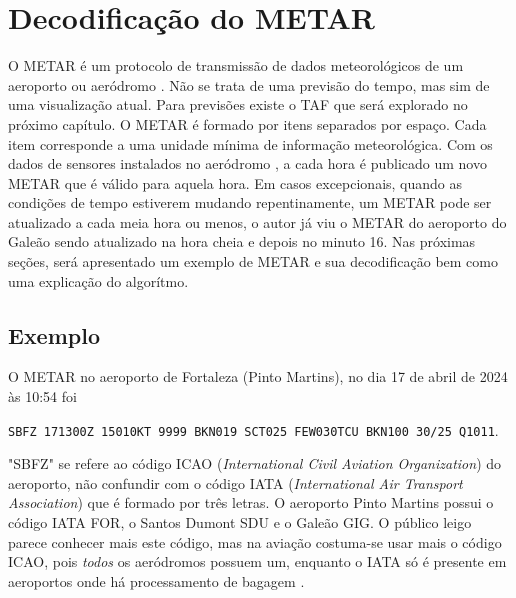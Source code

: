 \chapter{Decodificação do METAR}

O METAR é um protocolo de transmissão de dados meteorológicos de um aeroporto ou 
aeródromo \cite{metar-what}. Não se trata de uma previsão do tempo, mas sim de uma visualização atual. 
Para previsões existe o TAF que será explorado no próximo capítulo.
O METAR é formado por itens separados por espaço. Cada item corresponde a uma 
unidade mínima de informação meteorológica. Com os dados de sensores instalados 
no aeródromo \cite{metar-weather-gov}, a cada hora é publicado um novo METAR que
é válido para aquela hora. Em casos excepcionais, quando as condições de tempo 
estiverem mudando repentinamente, um METAR pode ser atualizado a cada meia hora
 \cite{METAR-speci} ou menos, o autor já viu o METAR do aeroporto do Galeão sendo atualizado
 na hora cheia e depois no minuto 16. Nas próximas seções, será apresentado um 
 exemplo de METAR e sua decodificação bem como uma explicação do algorítmo.

\section{Exemplo}
O METAR no aeroporto de Fortaleza (Pinto Martins)\cite{METAR-sbfz}, no dia 17 de 
abril de 2024 às 10:54 foi

\texttt{SBFZ 171300Z 15010KT 9999 BKN019 SCT025 FEW030TCU BKN100 30/25 Q1011}.

"SBFZ" se refere ao código ICAO (\textit{International Civil Aviation Organization}) do 
aeroporto, não confundir com o código IATA (\textit{International Air Transport Association}) 
que é formado por três letras. O aeroporto Pinto Martins possui o código IATA FOR, 
o Santos Dumont SDU e o Galeão GIG. O público leigo parece conhecer mais este 
código, mas na aviação costuma-se usar mais o código ICAO, pois \textit{todos} os 
aeródromos possuem um, enquanto o IATA só é presente em aeroportos onde há 
processamento de bagagem \cite{iata-codes} \cite{icao-codes}.

